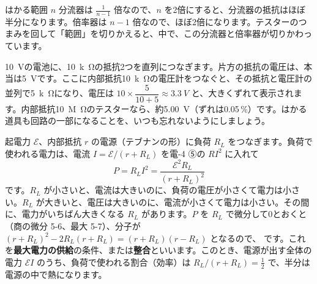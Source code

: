 \begin{phbaisuru}{はかる範囲 $n$}
分流器は $\tfrac{1}{n-1}$ 倍なので、$n$ を2倍にすると、分流器の抵抗はほぼ半分になります。倍率器は $n-1$ 倍なので、ほぼ2倍になります。テスターのつまみを回して「範囲」を切りかえると、中で、この分流器と倍率器が切りかわっています。
\end{phbaisuru}

\begin{phmijika}
\qty{10}{V}の電池に、\qty{10}{k\ohm}の抵抗2つを直列につなぎます。片方の抵抗の電圧は、本当は\qty{5}{V}です。ここに内部抵抗\qty{10}{k\ohm}の電圧計をつなぐと、その抵抗と電圧計の並列で\qty{5}{k\ohm}になり、電圧は $10\times\dfrac{5}{10+5}\approx\qty{3.3}{V}$ と、大きくずれて表示されます。内部抵抗\qty{10}{M\ohm}のテスターなら、約\qty{5.00}{V}（ずれは0.05\,\%）です。はかる道具も回路の一部になることを、いつも忘れないようにしましょう。
\end{phmijika}


\leavevmode\label{ph:電-5:sec9}起電力 $\mathcal E$、内部抵抗 $r$ の電源（テブナンの形）に負荷 $R_L$ をつなぎます。負荷で使われる電力は、電流 $I=\mathcal E/(r+R_L)$ を電-4 ⑤の $RI^2$ に入れて
\[ P=R_LI^2=\frac{\mathcal E^2R_L}{(r+R_L)^2} \]
です。$R_L$ が小さいと、電流は大きいのに、負荷の電圧が小さくて電力は小さい。$R_L$ が大きいと、電圧は大きいのに、電流が小さくて電力は小さい。その間に、電力がいちばん大きくなる $R_L$ があります。$P$ を $R_L$ で微分して0とおくと（商の微分 5-6、最大 5-7）、分子が $(r+R_L)^2-2R_L(r+R_L)=(r+R_L)(r-R_L)$ となるので、
\label{ph:電-5:maxp}です。これを\textbf{最大電力の供給}の条件、または\textbf{整合}といいます。このとき、電源が出す全体の電力 $\mathcal EI$ のうち、負荷で使われる割合（効率）は $R_L/(r+R_L)=\tfrac12$ で、半分は電源の中で熱になります。

